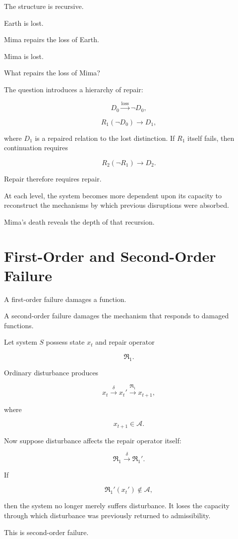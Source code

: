 \documentclass[11pt,oneside]{book}
\theoremstyle{definition}
\theoremstyle{remark}
\newcommand{\A}{\mathcal{A}}
\newcommand{\Repair}{\mathfrak{R}}
\begin{document}
The structure is recursive.

Earth is lost.

Mima repairs the loss of Earth.

Mima is lost.

What repairs the loss of Mima?

The question introduces a hierarchy of repair:

\[
D_0
\xrightarrow{\text{loss}}
\neg D_0,
\]

\[
R_1(\neg D_0)
\rightarrow
D_1,
\]

where \(D_1\) is a repaired relation to the lost distinction. If \(R_1\) itself fails, then continuation requires

\[
R_2(\neg R_1)
\rightarrow
D_2.
\]

Repair therefore requires repair.

At each level, the system becomes more dependent upon its capacity to reconstruct the mechanisms by which previous disruptions were absorbed.

Mima's death reveals the depth of that recursion.

\section{First-Order and Second-Order Failure}

A first-order failure damages a function.

A second-order failure damages the mechanism that responds to damaged functions.

Let system \(S\) possess state \(x_t\) and repair operator

\[
\Repair_1.
\]

Ordinary disturbance produces

\[
x_t
\xrightarrow{\delta}
x_t'
\xrightarrow{\Repair_1}
x_{t+1},
\]

where

\[
x_{t+1}\in\A.
\]

Now suppose disturbance affects the repair operator itself:

\[
\Repair_1
\xrightarrow{\delta}
\Repair_1'.
\]

If

\[
\Repair_1'(x_t')
\notin\A,
\]

then the system no longer merely suffers disturbance. It loses the capacity through which disturbance was previously returned to admissibility.

This is second-order failure.
\end{document}
